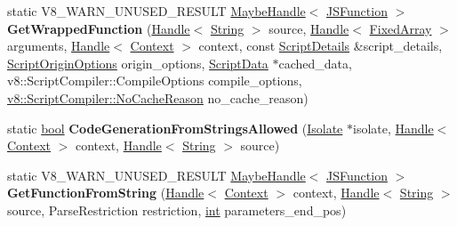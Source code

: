 \begin{DoxyCompactItemize}
\item 
\mbox{\label{classv8_1_1internal_1_1Compiler_a9731c45c3e69839f592543868c1c7912}} 
static V8\+\_\+\+W\+A\+R\+N\+\_\+\+U\+N\+U\+S\+E\+D\+\_\+\+R\+E\+S\+U\+LT \mbox{\hyperlink{classv8_1_1internal_1_1MaybeHandle}{Maybe\+Handle}}$<$ \mbox{\hyperlink{classv8_1_1internal_1_1JSFunction}{J\+S\+Function}} $>$ {\bfseries Get\+Wrapped\+Function} (\mbox{\hyperlink{classv8_1_1internal_1_1Handle}{Handle}}$<$ \mbox{\hyperlink{classv8_1_1internal_1_1String}{String}} $>$ source, \mbox{\hyperlink{classv8_1_1internal_1_1Handle}{Handle}}$<$ \mbox{\hyperlink{classv8_1_1internal_1_1FixedArray}{Fixed\+Array}} $>$ arguments, \mbox{\hyperlink{classv8_1_1internal_1_1Handle}{Handle}}$<$ \mbox{\hyperlink{classv8_1_1internal_1_1Context}{Context}} $>$ context, const \mbox{\hyperlink{structv8_1_1internal_1_1Compiler_1_1ScriptDetails}{Script\+Details}} \&script\+\_\+details, \mbox{\hyperlink{classv8_1_1ScriptOriginOptions}{Script\+Origin\+Options}} origin\+\_\+options, \mbox{\hyperlink{classv8_1_1internal_1_1ScriptData}{Script\+Data}} $\ast$cached\+\_\+data, v8\+::\+Script\+Compiler\+::\+Compile\+Options compile\+\_\+options, \mbox{\hyperlink{classv8_1_1ScriptCompiler_a7f13fa15484cfc500ae51927756e0d60}{v8\+::\+Script\+Compiler\+::\+No\+Cache\+Reason}} no\+\_\+cache\+\_\+reason)
\item 
\mbox{\label{classv8_1_1internal_1_1Compiler_a271b0b1d354fd3be04fb01d4fdedeb1c}} 
static \mbox{\hyperlink{classbool}{bool}} {\bfseries Code\+Generation\+From\+Strings\+Allowed} (\mbox{\hyperlink{classv8_1_1internal_1_1Isolate}{Isolate}} $\ast$isolate, \mbox{\hyperlink{classv8_1_1internal_1_1Handle}{Handle}}$<$ \mbox{\hyperlink{classv8_1_1internal_1_1Context}{Context}} $>$ context, \mbox{\hyperlink{classv8_1_1internal_1_1Handle}{Handle}}$<$ \mbox{\hyperlink{classv8_1_1internal_1_1String}{String}} $>$ source)
\item 
\mbox{\label{classv8_1_1internal_1_1Compiler_a088e9a3ab4f065fb2268eaa8becbcab6}} 
static V8\+\_\+\+W\+A\+R\+N\+\_\+\+U\+N\+U\+S\+E\+D\+\_\+\+R\+E\+S\+U\+LT \mbox{\hyperlink{classv8_1_1internal_1_1MaybeHandle}{Maybe\+Handle}}$<$ \mbox{\hyperlink{classv8_1_1internal_1_1JSFunction}{J\+S\+Function}} $>$ {\bfseries Get\+Function\+From\+String} (\mbox{\hyperlink{classv8_1_1internal_1_1Handle}{Handle}}$<$ \mbox{\hyperlink{classv8_1_1internal_1_1Context}{Context}} $>$ context, \mbox{\hyperlink{classv8_1_1internal_1_1Handle}{Handle}}$<$ \mbox{\hyperlink{classv8_1_1internal_1_1String}{String}} $>$ source, Parse\+Restriction restriction, \mbox{\hyperlink{classint}{int}} parameters\+\_\+end\+\_\+pos)

\end{DoxyCompactItemize}
